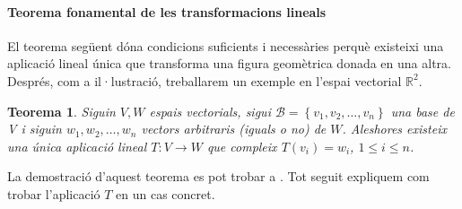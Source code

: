 \documentclass[12pt,a4paper]{article}
\newtheorem{teor}{Teorema}
\begin{document}
\paragraph{\textbf{Teorema fonamental de les transformacions lineals}} El teorema següent dóna condicions suficients i necessàries perquè existeixi una aplicació lineal única que transforma una figura geomètrica donada en una altra. Després, com a il·lustració, treballarem un exemple en l'espai vectorial $\mathbb{R}^{2}$.

\begin{teor} \label{teo:teo1}
Siguin $V,W$ espais vectorials, sigui $\mathcal{B}= \left\lbrace v_{1}, v_{2},\ldots, v_{n}\right\rbrace$ una base de V i siguin $w_{1}, w_{2},\ldots,w_{n}$ vectors arbitraris (iguals o no) de $W$. Aleshores existeix una única aplicació lineal $T: V \rightarrow W$ que compleix $T(v_{i})=w_{i}$, $1 \leq i \leq n$.
\end{teor}

La demostració d'aquest teorema es pot trobar a \cite{cedo}. Tot seguit expliquem com trobar l'aplicació $T$ en un cas concret.
\end{document}
